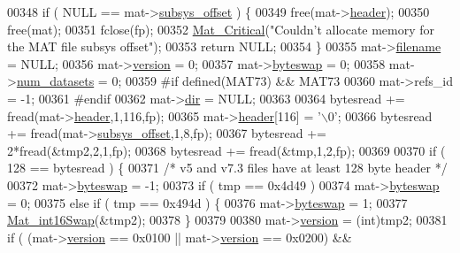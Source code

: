 \begin{DoxyCode}
{{{{{{{{{{{{{{{{00348     \textcolor{keywordflow}{if} ( NULL == mat->\hyperlink{struct__mat__t_a19317c01209959d755d69311960d3eec}{subsys\_offset} ) \{
00349         free(mat->\hyperlink{struct__mat__t_a5ed5d0e4e3c4d76b626a8a1772d579c4}{header});
00350         free(mat);
00351         fclose(fp);
00352         \hyperlink{group__mat__util_gaf51f2bfbb5580f575e4dd79757e2b80c}{Mat\_Critical}(\textcolor{stringliteral}{"Couldn't allocate memory for the MAT file subsys offset"});
00353         \textcolor{keywordflow}{return} NULL;
00354     \}
00355     mat->\hyperlink{struct__mat__t_a340b191598135edd03b6dec847f0b1b1}{filename}      = NULL;
00356     mat->\hyperlink{struct__mat__t_a729c2bc0afc97485057a5af425635b1a}{version}       = 0;
00357     mat->\hyperlink{struct__mat__t_a99d207977af5e04941ace56d71817a40}{byteswap}      = 0;
00358     mat->\hyperlink{struct__mat__t_af37d0ba323e65edb27ecd5a2f766a3a4}{num\_datasets}  = 0;
00359 \textcolor{preprocessor}{#if defined(MAT73) && MAT73}
00360     mat->refs\_id       = -1;
00361 \textcolor{preprocessor}{#endif}
00362     mat->\hyperlink{struct__mat__t_a1bc6c604459d0787801d5e53d365684c}{dir}           = NULL;
00363 
00364     bytesread += fread(mat->\hyperlink{struct__mat__t_a5ed5d0e4e3c4d76b626a8a1772d579c4}{header},1,116,fp);
00365     mat->\hyperlink{struct__mat__t_a5ed5d0e4e3c4d76b626a8a1772d579c4}{header}[116] = \textcolor{charliteral}{'\(\backslash\)0'};
00366     bytesread += fread(mat->\hyperlink{struct__mat__t_a19317c01209959d755d69311960d3eec}{subsys\_offset},1,8,fp);
00367     bytesread += 2*fread(&tmp2,2,1,fp);
00368     bytesread += fread(&tmp,1,2,fp);
00369 
00370     \textcolor{keywordflow}{if} ( 128 == bytesread ) \{
00371         \textcolor{comment}{/* v5 and v7.3 files have at least 128 byte header */}
00372         mat->\hyperlink{struct__mat__t_a99d207977af5e04941ace56d71817a40}{byteswap} = -1;
00373         \textcolor{keywordflow}{if} ( tmp == 0x4d49 )
00374             mat->\hyperlink{struct__mat__t_a99d207977af5e04941ace56d71817a40}{byteswap} = 0;
00375         \textcolor{keywordflow}{else} \textcolor{keywordflow}{if} ( tmp == 0x494d ) \{
00376             mat->\hyperlink{struct__mat__t_a99d207977af5e04941ace56d71817a40}{byteswap} = 1;
00377             \hyperlink{endian_8c_a741eb8019dbc3e8addfc0e75adb0dd90}{Mat\_int16Swap}(&tmp2);
00378         \}
00379 
00380         mat->\hyperlink{struct__mat__t_a729c2bc0afc97485057a5af425635b1a}{version} = (int)tmp2;
00381         \textcolor{keywordflow}{if} ( (mat->\hyperlink{struct__mat__t_a729c2bc0afc97485057a5af425635b1a}{version} == 0x0100 || mat->\hyperlink{struct__mat__t_a729c2bc0afc97485057a5af425635b1a}{version} == 0x0200) &&
}}}}}}}}}}}}}}}}
\end{DoxyCode}
